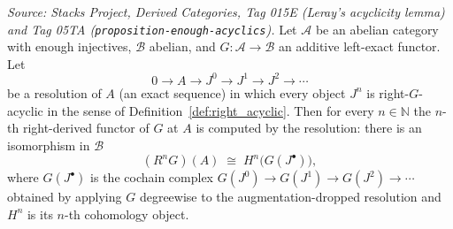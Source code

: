 \begin{theorem}\leanok
  \label{lem:acyclic_resolution_computes_derived}
  \textit{Source: Stacks Project, Derived Categories, Tag 015E (Leray's acyclicity
  lemma) and Tag 05TA (\texttt{proposition-enough-acyclics}).}
  Let \(\mathcal{A}\) be an abelian category with enough injectives, \(\mathcal{B}\)
  abelian, and \(G : \mathcal{A} \to \mathcal{B}\) an additive left-exact functor.
  Let
  \[
    0 \longrightarrow A
      \longrightarrow J^0 \longrightarrow J^1 \longrightarrow J^2
      \longrightarrow \cdots
  \]
  be a resolution of \(A\) (an exact sequence) in which every object \(J^n\) is
  right-\(G\)-acyclic in the sense of Definition~\ref{def:right_acyclic}. Then for
  every \(n \in \mathbb{N}\) the \(n\)-th right-derived functor of \(G\) at \(A\) is
  computed by the resolution: there is an isomorphism in \(\mathcal{B}\)
  \[
    (R^n G)(A) \;\cong\; H^n\bigl(G(J^\bullet)\bigr),
  \]
  where \(G(J^\bullet)\) is the cochain complex
  \(G(J^0) \to G(J^1) \to G(J^2) \to \cdots\) obtained by applying \(G\) degreewise
  to the augmentation-dropped resolution and \(H^n\) is its \(n\)-th cohomology
  object.
\end{theorem}

